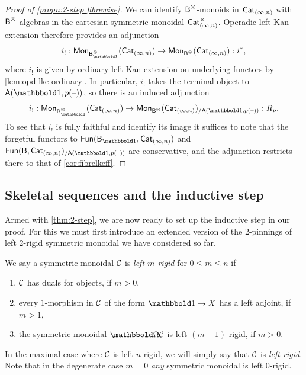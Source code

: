 \documentclass[a4paper,11pt]{article}
\begin{document}
\begin{proof}[Proof of \cref{propn:2-step fibrewise}]
  We can identify $\textup{\textsf{B}}^{\otimes}$-monoids in $\textup{\textsf{Cat}}_{(\infty,n)}$ with
  $\textup{\textsf{B}}^{\otimes}$-algebras in the cartesian symmetric monoidal \icat{}
  $\textup{\textsf{Cat}}_{(\infty,n)}^{\times}$. Operadic left Kan extension \cite[\S 3.1.2]{HA}
  therefore provides an adjunction
  \[ i_{!} : \Mon_{\oB_{\bbone}^{\otimes}}(\CatIn) \to
    \Mon_{\oB^{\otimes}}(\CatIn) : i^{*},\]
  where $i_{!}$ is given by ordinary left Kan extension on underlying
  functors by \cref{lem:opd lke ordinary}. In particular, $i_{!}$
  takes the terminal object to $\oA(\bbone,p(\blank))$, so there is an
  induced adjunction
  \[ i_{!} : \Mon_{\oB_{\bbone}^{\otimes}}(\CatIn) \to
    \Mon_{\oB^{\otimes}}(\CatIn)_{/\oA(\bbone,p(\blank))} : R_{p}.\]
  To see that $i_{!}$ is fully faithful and identify its image it
  suffices to note that the forgetful functors to
  $\Fun(\oB_{\bbone}, \CatIn)$ and
  $\Fun(\oB, \CatIn)_{/\oA(\bbone,p(\blank))}$ are conservative, and
  the adjunction restricts there to that of \cref{cor:fibrelkeff}.
\end{proof}



\subsection{Skeletal sequences and the inductive step}
\label{sec:skeletal}

Armed with \cref{thm:2-step}, we are now ready to set up the inductive
step in our proof. For this we must first introduce an extended
version of the 2-pinnings of left 2-rigid symmetric monoidal \incats{}
we have considered so far.

\begin{defn}\label{defn:left m-rig}
  We say a symmetric monoidal \incat{} $\mathcal{C}$ is \emph{left $m$-rigid}
  for $0 \leq m \leq n$ if
  \begin{enumerate}[(1)]
  \item $\mathcal{C}$ has duals for objects, if $m > 0$,
  \item every $1$-morphism in $\mathcal{C}$ of the form $\bbone \to X$ has a
    left adjoint, if $m > 1$,
  \item the symmetric monoidal \incat{} $\mOm \nC$ is left
    $(m-1)$-rigid, if $m > 0$.
  \end{enumerate}
  In the maximal case where $\mathcal{C}$ is left $n$-rigid, we will simply
  say that $\mathcal{C}$ is \emph{left rigid}.
  Note that in the degenerate case $m = 0$ \emph{any}
  symmetric monoidal \incat{} is left $0$-rigid.
\end{defn}
\end{document}
